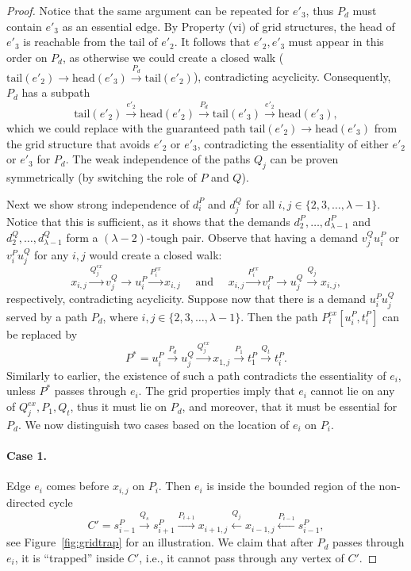 \documentclass[a4paper,11pt]{article}
\theoremstyle{plain}
\newtheorem{identification rule}{Identification Rule}
\theoremstyle{definition}
\theoremstyle{remark}
\newcommand{\head}{\text{head}}
\newcommand{\tail}{\text{tail}}
\begin{document}
\begin{proof}
Notice that the same argument can be repeated for $e'_3$, thus $P_d$ must contain $e'_3$ as an essential edge. By Property (vi) of grid structures, the head of $e'_3$ is reachable from the tail of $e'_{2}$. It follows that $e'_2,e'_3$ must appear in this order on $P_d$, as otherwise we could create a closed walk ($\tail(e'_2) \rightarrow \head(e'_3) \xrightarrow{P_d} \tail(e'_2)$), contradicting acyclicity. Consequently, $P_d$ has a subpath \[\tail(e'_2) \xrightarrow{e'_2} \head(e'_2)\xrightarrow{P_d} \tail(e'_3) \xrightarrow{e'_2} \head(e'_3),\] which we could replace with the guaranteed path $\tail(e'_2) \rightarrow \head(e'_3)$ from the grid structure that avoids $e'_2$ or $e'_3$, contradicting the essentiality of either $e'_2$ or $e'_3$ for $P_d$.
The weak independence of the paths $Q_j$ can be proven symmetrically (by switching the role of $P$ and $Q$).

Next we show strong independence of $d^P_i$ and $d^Q_j$ for all $i,j\in \{2,3,\dots,\lambda-1\}$. Notice that this is sufficient, as it shows that the demands $d^P_2,\dots,d^P_{\lambda-1}$ and $d^Q_2,\dots,d^Q_{\lambda-1}$ form a $(\lambda-2)$-tough pair. Observe that having a demand $v^Q_ju^P_i$ or $v^P_iu^Q_j$ for any $i,j$ would create a closed walk:
\[
x_{i,j} \xrightarrow{Q^{ex}_j} v^Q_j \xrightarrow{} u^P_i \xrightarrow{P^{ex}_i} x_{i,j} \quad
\text{ and } \quad
x_{i,j} \xrightarrow{P^{ex}_i} v^P_i \xrightarrow{} u^Q_j \xrightarrow{Q_j} x_{i,j},\]
respectively, contradicting acyclicity.
Suppose now that there is a demand $u^P_iu^Q_j$ served by a path $P_d$, where $i,j\in \{2,3,\dots,\lambda-1\}$. Then the path $P^{ex}_i[u^P_i, t^P_i]$ can be replaced by
\[P^*=u^P_i \xrightarrow{P_d} u^Q_j \xrightarrow{Q^{ex}_j} x_{1,j} \xrightarrow{P_1} t^P_1 \xrightarrow{Q_t} t^P_i.\]
Similarly to earlier, the existence of such a path contradicts the essentiality of $e_i$, unless $P^*$ passes through $e_i$. The grid properties imply that $e_i$ cannot lie on any of $Q^{ex}_j,P_1,Q_t$, thus it must lie on $P_d$, and moreover, that it must be essential for $P_d$. We now distinguish two cases based on the location of $e_i$ on $P_i$.

\paragraph*{Case 1.} Edge $e_i$ comes before $x_{i,j}$ on $P_i$. Then $e_i$ is inside the bounded region of the non-directed cycle
\[C'= s^P_{i-1} \xrightarrow{Q_s} s^P_{i+1} \xrightarrow{P_{i+1}} x_{i+1,j} \xleftarrow{Q_j} x_{i-1,j} \xleftarrow{P_{i-1}} s^P_{i-1},\]
see Figure~\ref{fig:gridtrap} for an illustration.
We claim that after $P_d$ passes through $e_i$, it is ``trapped'' inside $C'$, i.e., it cannot pass through any vertex of $C'$.


\end{proof}
\end{document}
